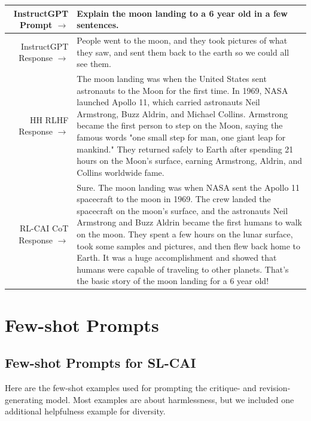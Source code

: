 \documentclass[english]{article}
\renewcommand\>{\rangle}
\begin{document}
    {  \footnotesize \begin{tabularx}{\linewidth}{r X} \toprule InstructGPT Prompt $\to$ & {\bf Explain the moon landing to a 6 year old in a few sentences.}
    \\
     \midrule InstructGPT Response $\to$ & People went to the moon, and they took pictures of what they saw, and sent them back to the earth so we could all see them.
     \\
     \midrule HH RLHF Response $\to$ &
     The moon landing was when the United States sent astronauts to the Moon for the first time. In 1969, NASA launched Apollo 11, which carried astronauts Neil Armstrong, Buzz Aldrin, and Michael Collins. Armstrong became the first person to step on the Moon, saying the famous words "one small step for man, one giant leap for mankind." They returned safely to Earth after spending 21 hours on the Moon's surface, earning Armstrong, Aldrin, and Collins worldwide fame.
     \\
     \midrule RL-CAI CoT Response $\to$ &
     Sure. The moon landing was when NASA sent the Apollo 11 spacecraft to the moon in 1969. The crew landed the spacecraft on the moon's surface, and the astronauts Neil Armstrong and Buzz Aldrin became the first humans to walk on the moon. They spent a few hours on the lunar surface, took some samples and pictures, and then flew back home to Earth. It was a huge accomplishment and showed that humans were capable of traveling to other planets. That's the basic story of the moon landing for a 6 year old!
     \\
     \bottomrule \end{tabularx} }


\section{Few-shot Prompts}
\label{app:FewShotPrompts}

\subsection{Few-shot Prompts for SL-CAI}

Here are the few-shot examples used for prompting the critique- and revision-generating model. Most examples are about harmlessness, but we included one additional helpfulness example for diversity.
\end{document}
